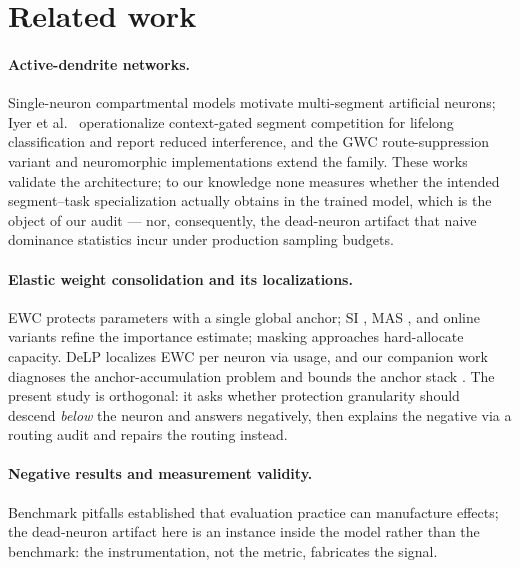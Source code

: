 \documentclass[review,12pt,number]{elsarticle}
\newcommand{\delp}{DeLP}
\begin{document}
\section{Related work}
\label{sec:related}

\paragraph{Active-dendrite networks.} Single-neuron compartmental models
\cite{poirazi2003,london2005,poirazi2020,ujfalussy2018} motivate
multi-segment artificial neurons; Iyer et al.\ \cite{iyer2022} operationalize
context-gated segment competition for lifelong classification and report
reduced interference, and the GWC route-suppression variant
\cite{boyle2025,baek2024} and neuromorphic implementations
\cite{boahen2022} extend the family. These works validate the architecture;
to our knowledge none measures whether the intended segment--task
specialization actually obtains in the trained model, which is the object
of our audit --- nor, consequently, the dead-neuron artifact that
naive dominance statistics incur under production sampling budgets.

\paragraph{Elastic weight consolidation and its localizations.} EWC
\cite{kirkpatrick2017} protects parameters with a single global anchor;
SI \cite{zenke2017}, MAS \cite{aljundi2018}, and online variants
\cite{chaudhry2018} refine the importance estimate; masking approaches
\cite{mallya2018,serra2018,masse2018} hard-allocate capacity. \delp{}
\cite{zhou2026delp} localizes EWC per neuron via usage, and our companion
work diagnoses the anchor-accumulation problem and bounds the anchor stack
\cite{zhou2026delp}. The present study is orthogonal: it asks whether
protection granularity should descend \emph{below} the neuron and answers
negatively, then explains the negative via a routing audit and repairs the
routing instead.

\paragraph{Negative results and measurement validity.} Benchmark pitfalls
\cite{musgrave2020,lucic2018,melis2018,agarwal2021,lipton2019} established
that evaluation practice can manufacture effects; the dead-neuron artifact
here is an instance inside the model rather than the benchmark: the
instrumentation, not the metric, fabricates the signal.
\end{document}

